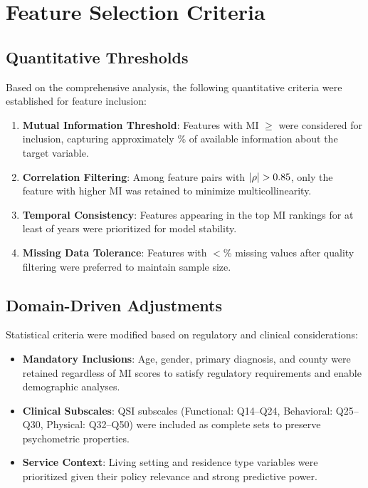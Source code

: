 \section{Feature Selection Criteria}
\label{sec:selection-criteria}

\subsection{Quantitative Thresholds}
\label{subsec:quantitative-thresholds}

Based on the comprehensive analysis, the following quantitative criteria were established for feature inclusion:

\begin{enumerate}
    \item \textbf{Mutual Information Threshold}: Features with MI $\geq$ \FSMIThreshold{} were considered for inclusion, capturing approximately \FSBootstrapStability\% of available information about the target variable.
    
    \item \textbf{Correlation Filtering}: Among feature pairs with $|\rho| > 0.85$, only the feature with higher MI was retained to minimize multicollinearity.
    
    \item \textbf{Temporal Consistency}: Features appearing in the top \FSTopTwentyThreshold{} MI rankings for at least \FSTemporalConsistencyYears{} of \FSNumFiscalYears{} years were prioritized for model stability.
    
    \item \textbf{Missing Data Tolerance}: Features with $<$\FSMissingDataThreshold\% missing values after quality filtering were preferred to maintain sample size.
\end{enumerate}

\subsection{Domain-Driven Adjustments}
\label{subsec:domain-adjustments}

Statistical criteria were modified based on regulatory and clinical considerations:

\begin{itemize}
    \item \textbf{Mandatory Inclusions}: Age, gender, primary diagnosis, and county were retained regardless of MI scores to satisfy regulatory requirements and enable demographic analyses.
    
    \item \textbf{Clinical Subscales}: QSI subscales (Functional: Q14--Q24, Behavioral: Q25--Q30, Physical: Q32--Q50) were included as complete sets to preserve psychometric properties.
    
    \item \textbf{Service Context}: Living setting and residence type variables were prioritized given their policy relevance and strong predictive power.
\end{itemize}

